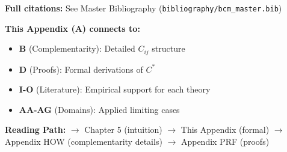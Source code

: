 \textbf{Full citations:} See Master Bibliography (\texttt{bibliography/bcm\_master.bib})


\begin{tcolorbox}[colback=gray!10!white, colframe=gray!75!black,
    title=\textbf{Cross-Reference Footer}]
\label{sec:A-footer}

\textbf{This Appendix (A) connects to:}
\begin{itemize}[nosep]
    \item \textbf{B} (Complementarity): Detailed $C_{ij}$ structure
    \item \textbf{D} (Proofs): Formal derivations of $C^*$
    \item \textbf{I-O} (Literature): Empirical support for each theory
    \item \textbf{AA-AG} (Domains): Applied limiting cases
\end{itemize}

\textbf{Reading Path:}
$\rightarrow$ Chapter 5 (intuition) $\rightarrow$ This Appendix (formal)
$\rightarrow$ Appendix HOW (complementarity details) $\rightarrow$ Appendix PRF (proofs)

\end{tcolorbox}
